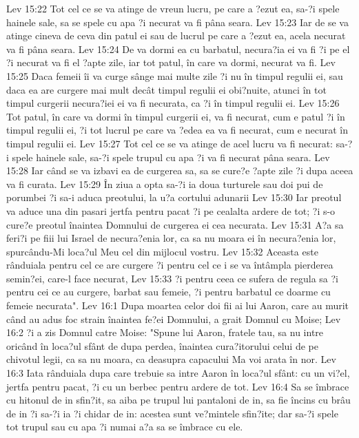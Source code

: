 Lev 15:22  Tot cel ce se va atinge de vreun lucru, pe care a ?ezut ea, sa-?i spele hainele sale, sa se spele cu apa ?i necurat va fi pâna seara.
Lev 15:23  Iar de se va atinge cineva de ceva din patul ei sau de lucrul pe care a ?ezut ea, acela necurat va fi pâna seara.
Lev 15:24  De va dormi ea cu barbatul, necura?ia ei va fi ?i pe el ?i necurat va fi el ?apte zile, iar tot patul, în care va dormi, necurat va fi.
Lev 15:25  Daca femeii îi va curge sânge mai multe zile ?i nu în timpul regulii ei, sau daca ea are curgere mai mult decât timpul regulii ei obi?nuite, atunci în tot timpul curgerii necura?iei ei va fi necurata, ca ?i în timpul regulii ei.
Lev 15:26  Tot patul, în care va dormi în timpul curgerii ei, va fi necurat, cum e patul ?i în timpul regulii ei, ?i tot lucrul pe care va ?edea ea va fi necurat, cum e necurat în timpul regulii ei.
Lev 15:27  Tot cel ce se va atinge de acel lucru va fi necurat: sa-?i spele hainele sale, sa-?i spele trupul cu apa ?i va fi necurat pâna seara.
Lev 15:28  Iar când se va izbavi ea de curgerea sa, sa se cure?e ?apte zile ?i dupa aceea va fi curata.
Lev 15:29  În ziua a opta sa-?i ia doua turturele sau doi pui de porumbei ?i sa-i aduca preotului, la u?a cortului adunarii
Lev 15:30  Iar preotul va aduce una din pasari jertfa pentru pacat ?i pe cealalta ardere de tot; ?i s-o cure?e preotul înaintea Domnului de curgerea ei cea necurata.
Lev 15:31  A?a sa feri?i pe fiii lui Israel de necura?enia lor, ca sa nu moara ei în necura?enia lor, spurcându-Mi loca?ul Meu cel din mijlocul vostru.
Lev 15:32  Aceasta este rânduiala pentru cel ce are curgere ?i pentru cel ce i se va întâmpla pierderea semin?ei, care-l face necurat,
Lev 15:33  ?i pentru ceea ce sufera de regula sa ?i pentru cei ce au curgere, barbat sau femeie, ?i pentru barbatul ce doarme cu femeie necurata".
Lev 16:1  Dupa moartea celor doi fii ai lui Aaron, care au murit când au adus foc strain înaintea fe?ei Domnului, a grait Domnul cu Moise;
Lev 16:2  ?i a zis Domnul catre Moise: "Spune lui Aaron, fratele tau, sa nu intre oricând în loca?ul sfânt de dupa perdea, înaintea cura?itorului celui de pe chivotul legii, ca sa nu moara, ca deasupra capacului Ma voi arata în nor.
Lev 16:3  Iata rânduiala dupa care trebuie sa intre Aaron în loca?ul sfânt: cu un vi?el, jertfa pentru pacat, ?i cu un berbec pentru ardere de tot.
Lev 16:4  Sa se îmbrace cu hitonul de in sfin?it, sa aiba pe trupul lui pantaloni de in, sa fie încins cu brâu de in ?i sa-?i ia ?i chidar de in: acestea sunt ve?mintele sfin?ite; dar sa-?i spele tot trupul sau cu apa ?i numai a?a sa se îmbrace cu ele.
